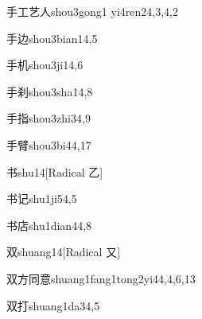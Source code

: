 \begin{verbete}{手工艺人}{shou3gong1 yi4ren2}{4,3,4,2}
\end{verbete}

\begin{verbete}{手边}{shou3bian1}{4,5}
\end{verbete}

\begin{verbete}{手机}{shou3ji1}{4,6}
\end{verbete}

\begin{verbete}{手刹}{shou3sha1}{4,8}
\end{verbete}

\begin{verbete}{手指}{shou3zhi3}{4,9}
\end{verbete}

\begin{verbete}{手臂}{shou3bi4}{4,17}
\end{verbete}

\begin{verbete}{书}{shu1}{4}[Radical 乙]
\end{verbete}

\begin{verbete}{书记}{shu1ji5}{4,5}
\end{verbete}

\begin{verbete}{书店}{shu1dian4}{4,8}
\end{verbete}

\begin{verbete}{双}{shuang1}{4}[Radical 又]
\end{verbete}

\begin{verbete}{双方同意}{shuang1fang1tong2yi4}{4,4,6,13}
\end{verbete}

\begin{verbete}{双打}{shuang1da3}{4,5}
\end{verbete}

